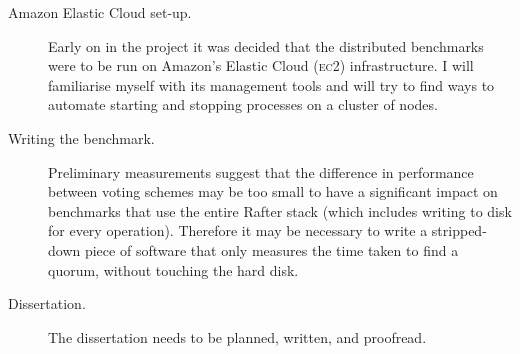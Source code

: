 \documentclass[10pt]{scrartcl}
\begin{document}
\begin{description}
    \item[Amazon Elastic Cloud set-up.] Early on in the project it was decided that the distributed benchmarks were to be run on Amazon's Elastic Cloud (\textsc{ec2}) infrastructure. I will familiarise myself with its management tools and will try to find ways to automate starting and stopping processes on a cluster of nodes.
    \item[Writing the benchmark.] Preliminary measurements suggest that the difference in performance between voting schemes may be too small to have a significant impact on benchmarks that use the entire Rafter stack (which includes writing to disk for every operation). Therefore it may be necessary to write a stripped-down piece of software that only measures the time taken to find a quorum, without touching the hard disk.
    \item[Dissertation.] The dissertation needs to be planned, written, and proofread.
\end{description}



\end{document}
